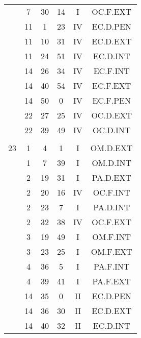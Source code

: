 \documentclass[12pt, a4paper]{article}
\begin{document}
\begin{multicols}{3}
{\begin{tabular}{c c c c c c}
	 	 	 	 & 7 & 30 & 14 & I & OC.F.EXT\\%
	 	 	 	 & 11 & 1 & 23 & IV & EC.D.PEN\\%
	 	 	 	 & 11 & 10 & 31 & IV & EC.D.EXT\\%
	 	 	 	 & 11 & 24 & 51 & IV & EC.D.INT\\%
	 	 	 	 & 14 & 26 & 34 & IV & EC.F.INT\\%
	 	 	 	 & 14 & 40 & 54 & IV & EC.F.EXT\\%
	 	 	 	 & 14 & 50 & 0 & IV & EC.F.PEN\\%
	 	 	 	 & 22 & 27 & 25 & IV & OC.D.EXT\\%
	 	 	 	 & 22 & 39 & 49 & IV & OC.D.INT\\%
	 	 	 	 & & & & & \\%
	 	 	 	23 & 1 & 4 & 1 & I & OM.D.EXT\\%
	 	 	 	 & 1 & 7 & 39 & I & OM.D.INT\\%
	 	 	 	 & 2 & 19 & 31 & I & PA.D.EXT\\%
	 	 	 	 & 2 & 20 & 16 & IV & OC.F.INT\\%
	 	 	 	 & 2 & 23 & 7 & I & PA.D.INT\\%
	 	 	 	 & 2 & 32 & 38 & IV & OC.F.EXT\\%
	 	 	 	 & 3 & 19 & 49 & I & OM.F.INT\\%
	 	 	 	 & 3 & 23 & 25 & I & OM.F.EXT\\%
	 	 	 	 & 4 & 36 & 5 & I & PA.F.INT\\%
	 	 	 	 & 4 & 39 & 41 & I & PA.F.EXT\\%
	 	 	 	 & 14 & 35 & 0 & II & EC.D.PEN\\%
	 	 	 	 & 14 & 36 & 30 & II & EC.D.EXT\\%
	 	 	 	 & 14 & 40 & 32 & II & EC.D.INT\\%
	 	 \end{tabular}
 	}
\end{multicols}
\end{document}
